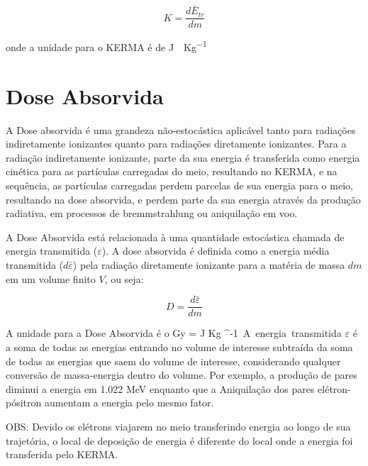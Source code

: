 \documentclass[11pt,a4paper]{article}
\newcounter{exemplo}
\begin{document}
			\begin{equation}
				K = \frac{d \bar{E}_{tr}}{d m}
			\end{equation}

		\noindent onde a unidade para o KERMA é de \unit{J \cdot Kg^{-1}}


	\section{Dose Absorvida}

		A Dose absorvida é uma grandeza não-estocástica aplicável tanto para radiações indiretamente ionizantes quanto para radiações diretamente ionizantes. Para a radiação indiretamente ionizante, parte da sua energia é transferida como energia cinética para as partículas carregadas do meio, resultando no KERMA, e na sequência, as partículas carregadas perdem parcelas de sua energia para o meio, resultando na dose absorvida, e perdem parte da sua energia através da produção radiativa, em processos de bremmstrahlung ou aniquilação em voo. 
		
		
		A Dose  Absorvida está relacionada à uma quantidade estocástica chamada de energia transmitida ($\varepsilon$). A dose absorvida é definida como a energia média transmitida ($d\bar{\varepsilon}$) pela radiação diretamente ionizante para a matéria de massa $dm$ em um volume finito $V$, ou seja:


			\begin{equation}
				D = \frac{d \bar{\varepsilon}}{d m}
			\end{equation}

		\noindent A unidade para a Dose Absorvida é o Gy = \unit{J \cdot Kg ^{-1}}.

		A energia transmitida $\varepsilon$ é a soma de todas as energias entrando no volume de interesse subtraída da soma de todas as energias que saem do volume de interesse, considerando qualquer conversão de massa-energia dentro do volume. Por exemplo, a produção de pares diminui a energia em 1.022 MeV enquanto que a Aniquilação dos pares elétron-pósitron aumentam a energia pelo mesmo fator. 

		\textcolor{CarnationPink}{OBS:} Devido os elétrons viajarem no meio transferindo energia ao longo de sua trajetória, o local de deposição de energia é diferente do local onde a energia foi transferida pelo KERMA. 








  
\end{document}
